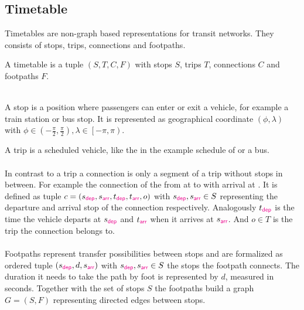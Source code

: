 \subsection{Timetable}
	Timetables  are non-graph based representations for transit networks.
	They consists of stops, trips, connections and footpaths.
	\begin{mydef}\label{timetable}
		A \textnormal{timetable} is a tuple $(S, T, C, F)$ with stops $S$, trips $T$, connections $C$ and footpaths $F$.
	\end{mydef}\quad\\
	A stop is a position where passengers can enter or exit a vehicle, for example a train station or bus stop.
	It is represented as geographical coordinate $(\phi, \lambda)$ with $\phi \in \left(-\frac{\pi}{2}, \frac{\pi}{2}\right),
	\lambda \in \left[-\pi, \pi\right)$.
	
	A trip is a scheduled vehicle, like the \ticef in the example schedule of  or a bus.\\\\
	In contrast to a trip a connection is only a segment of a trip without stops in between. For example the connection
	of the \ticef from \freiburg at  to \offenburg with arrival at .
	It is defined as tuple $c = (s_{\textcolor{magenta}{\textsf{dep}}}, s_{\textcolor{magenta}{\textsf{arr}}}, t_{\textcolor{magenta}{\textsf{dep}}}, t_{\textcolor{magenta}{\textsf{arr}}}, o)$ with $s_{\textcolor{magenta}{\textsf{dep}}}, s_{\textcolor{magenta}{\textsf{arr}}} \in S$ representing the
	departure and arrival stop of the connection respectively. Analogously $t_{\textcolor{magenta}{\textsf{dep}}}$ is the time the vehicle departs
	at $s_{\textcolor{magenta}{\textsf{dep}}}$ and $t_{\textcolor{magenta}{\textsf{arr}}}$ when it arrives at $s_{\textcolor{magenta}{\textsf{arr}}}$. And $o \in T$ is the trip the connection belongs to.\\\\
	Footpaths represent transfer possibilities between stops and are formalized as ordered tuple $(s_{\textcolor{magenta}{\textsf{dep}}}, d, s_{\textcolor{magenta}{\textsf{arr}}})$ with
	$s_{\textcolor{magenta}{\textsf{dep}}}, s_{\textcolor{magenta}{\textsf{arr}}} \in S$ the stops the footpath connects. The duration it needs to take the path by foot is
	represented by $d$, measured in seconds. Together with the set of stops $S$ the footpaths build a graph $G = (S, F)$
	representing directed edges between stops.
	
